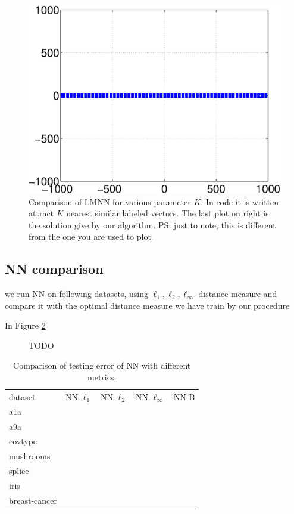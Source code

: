 \documentclass{article}
\begin{document}
\begin{figure}[h!]
\includegraphics[scale=.2]{fig/synthetic1our.eps}

\caption{Comparison of LMNN for various parameter $K$.
In code it is written 
 attract $K$ nearest similar labeled vectors. 
 The last plot on right is the solution give by our algorithm. 
 PS: just to note, this is different from the one you are used to plot.
}
\label{fig:synthetic}
\end{figure}

\clearpage
\subsection{NN comparison}

we run NN
on following datasets, using 
$\ell_1, \ell_2, \ell_\infty$ distance measure
and compare it with the optimal distance measure we have train by our procedure


In Figure \ref{fig:NN-exp}
\begin{figure}[h!]

\caption{TODO}
\label{fig:NN-exp}


\end{figure}




\begin{table}[h!]
\caption{Comparison of testing error of NN with different metrics.}
\label{tbl:BD-NN}
\begin{tabular}{l|r|r|r|r}
dataset & NN-$\ell_1$ 
		& NN-$\ell_2$
		& NN-$\ell_\infty$
        & NN-B
\\        
a1a
\\
a9a
\\
covtype
\\
mushrooms
\\
splice
\\
iris
\\
breast-cancer
\end{tabular}



\end{table}
\end{document}

